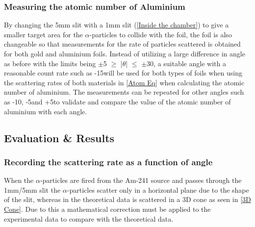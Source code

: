 \documentclass[12pt]{article}
\begin{document}
\subsubsection{Measuring the atomic number of Aluminium}
\label{Measuring the atomic number of Aluminium Subsubsection}

By changing the 5mm slit with a 1mm slit (\cref{Inside the chamber}) to give a smaller target area for the $\alpha$-particles to collide with the foil, the foil is also changeable so that measurements for the rate of particles scattered is obtained for both gold and aluminium foils. Instead of utilizing a large difference in angle as before with the limits being $\pm$5\textdegree \hspace{0.1mm} $\geq$ |$\theta$| $\leq$ $\pm$30\textdegree, a suitable angle with a reasonable count rate such as -15\textdegree will be used for both types of foils when using the scattering rates of both materials in \cref{Atom Eq} when calculating the atomic number of aluminium. The measurements can be repeated for other angles such as -10\textdegree, -5\textdegree and +5\textdegree to validate and compare the value of the atomic number of aluminium with each angle. \\


\subsection{Evaluation \& Results}
\label{Evaluation & Results Subsection}

\subsubsection{Recording the scattering rate as a function of angle}
\label{3.3 Recording the scattering rate as a function of angle Subsubsection}

When the $\alpha$-particles are fired from the Am-241 source and passes through the 1mm/5mm slit the $\alpha$-particles scatter only in a horizontal plane due to the shape of the slit, whereas in the theoretical data is scattered in a 3D cone as seen in \cref{3D Cone}. Due to this a mathematical correction must be applied to the experimental data to compare with the theoretical data. \\
\end{document}
